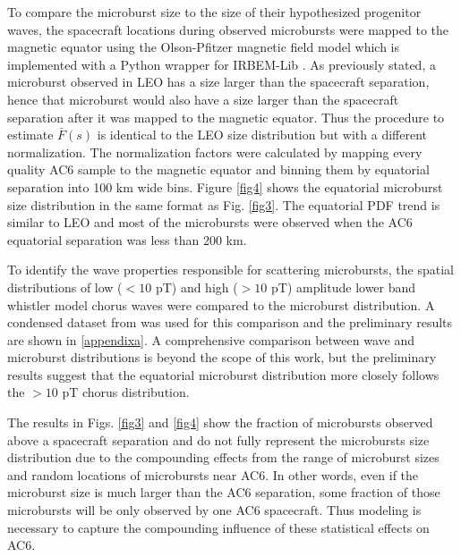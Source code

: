 \documentclass[draft]{agujournal2019}
\begin{document}
To compare the microburst size to the size of their hypothesized progenitor waves, the spacecraft locations during observed microbursts were mapped to the magnetic equator using the Olson-Pfitzer magnetic field model \cite{Olson1982} which is implemented with a Python wrapper for IRBEM-Lib \cite{irbem}. As previously stated, a microburst observed in LEO has a size larger than the spacecraft separation, hence that microburst would also have a size larger than the spacecraft separation after it was mapped to the magnetic equator. Thus the procedure to estimate $\bar{F}(s)$ is identical to the LEO size distribution but with a different normalization. The normalization factors were calculated by mapping every quality AC6 sample to the magnetic equator and binning them by equatorial separation into 100 km wide bins. Figure \ref{fig4} shows the equatorial microburst size distribution in the same format as Fig. \ref{fig3}. The equatorial PDF trend is similar to LEO and most of the microbursts were observed when the AC6 equatorial separation was less than 200 km.

To identify the wave properties responsible for scattering microbursts, the spatial distributions of low ($< 10$ pT) and high ($> 10$ pT) amplitude lower band whistler model chorus waves were compared to the microburst distribution. A condensed dataset from  was used for this comparison and the preliminary results are shown in \ref{appendixa}. A comprehensive comparison between wave and microburst distributions is beyond the scope of this work, but the preliminary results suggest that the equatorial microburst distribution more closely follows the $> 10$ pT chorus distribution.

The results in Figs. \ref{fig3} and \ref{fig4} show the fraction of microbursts observed above a spacecraft separation and do not fully represent the microbursts size distribution due to the compounding effects from the range of microburst sizes and random locations of microbursts near AC6. In other words, even if the microburst size is much larger than the AC6 separation, some fraction of those microbursts will be only observed by one AC6 spacecraft. Thus modeling is necessary to capture the compounding influence of these statistical effects on AC6.
\end{document}

